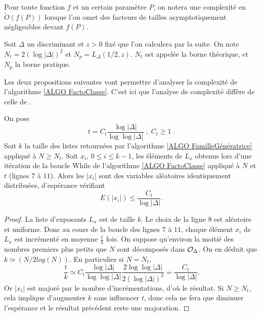 \begin{Def}
	Pour toute fonction $f$ et un certain paramètre $P$, on notera une complexité en $\tilde{O}(f(P))$ lorsque l'on omet des facteurs de tailles asymptotiquement négligeables devant $f(P)$.
\end{Def}

\begin{Def}
	Soit $\Delta$ un discriminant et $z>0$ fixé que l'on calculera par la suite. On note $N_{t} = 2(\log|\Delta|)^{2}$ et $N_{p} = L_\Delta(1/2,z)$. $N_{t}$ est appelée la borne théorique, et $N_{p}$ la borne pratique. 
\end{Def}

Les deux propositions suivantes vont permettre d'analyser la complexité de l'algorithme \ref{ALGO FactoClasse}. C'est ici que l'analyse de complexité diffère de celle de \cite{JaoSoukharev}. 

\begin{Prop}\label{espéranceExposant}
	On pose
	\begin{equation*}
		t = C_{t}\frac{\log |\Delta|}{\log \log |\Delta|}\;,\; C_{t} \geq 1\;.
	\end{equation*}
	 Soit $k$ la taille des listes retournées par l'algorithme \ref{ALGO FamilleGénératrice} appliqué à $N \geq N_{t}$. Soit $x_{i}$, $0\leq i \leq k-1$, les éléments de $L_{x}$ obtenus lors d'une itération de la boucle While de l'algorithme \ref{ALGO FactoClasse} appliqué à $N$ et $t$ (lignes $7$ à $11$). Alors les $|x_{i}|$ sont des variables aléatoires identiquement distribuées, d'espérance vérifiant
	 \begin{equation*}
	 	E(|x_{i}|)\leq\frac{C_{t}}{\log|\Delta|}. 
	 \end{equation*} 
\end{Prop}

\begin{proof}
	La liste d'exposants $L_{x}$ est de taille $k$. Le choix de la ligne $8$ est aléatoire et uniforme. Donc au cours de la boucle des lignes $7$ à $11$, chaque élément $x_{i}$ de $L_{x}$ est incrémenté en moyenne $\frac{t}{k}$ fois. On suppose qu'environ la moitié des nombres premiers plus petits que $N$ sont décomposés dans $\mathcal{O}_{\Delta}$. On en déduit que $k \simeq (N/2log(N))$. En particulier si $N = N_{t}$,
	\begin{equation*}
		\frac{t}{k} \simeq C_{t}\frac{\log |\Delta|}{\log \log |\Delta|}\frac{2\log\log|\Delta|}{2(\log|\Delta|)^2} = \frac{C_{t}}{\log|\Delta|}.
	\end{equation*}
	Or $|x_{i}|$ est majoré par le nombre d'incrémentations, d'où le résultat. Si $N \geq N_{t}$, cela implique d'augmenter $k$ sans influencer $t$, donc cela ne fera que diminuer l'espérance et le résultat précédent reste une majoration. 
\end{proof}

